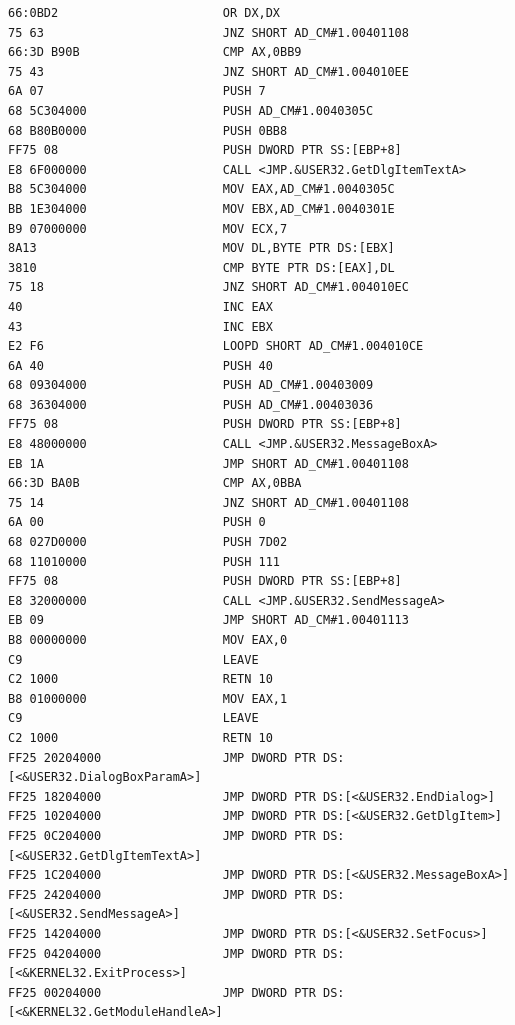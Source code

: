 \documentclass[times, utf8, diplomski, numeric]{fer}
\begin{document}
\begin{lstlisting}[frame=single, caption=Instrukcije unutar PE datoteke, label={lst:PE_instructions_full}]
66:0BD2                       OR DX,DX
75 63                         JNZ SHORT AD_CM#1.00401108
66:3D B90B                    CMP AX,0BB9
75 43                         JNZ SHORT AD_CM#1.004010EE
6A 07                         PUSH 7    
68 5C304000                   PUSH AD_CM#1.0040305C
68 B80B0000                   PUSH 0BB8   
FF75 08                       PUSH DWORD PTR SS:[EBP+8] 
E8 6F000000                   CALL <JMP.&USER32.GetDlgItemTextA> 
B8 5C304000                   MOV EAX,AD_CM#1.0040305C
BB 1E304000                   MOV EBX,AD_CM#1.0040301E 
B9 07000000                   MOV ECX,7
8A13                          MOV DL,BYTE PTR DS:[EBX]
3810                          CMP BYTE PTR DS:[EAX],DL
75 18                         JNZ SHORT AD_CM#1.004010EC
40                            INC EAX
43                            INC EBX
E2 F6                         LOOPD SHORT AD_CM#1.004010CE
6A 40                         PUSH 40  
68 09304000                   PUSH AD_CM#1.00403009
68 36304000                   PUSH AD_CM#1.00403036               
FF75 08                       PUSH DWORD PTR SS:[EBP+8]
E8 48000000                   CALL <JMP.&USER32.MessageBoxA>
EB 1A                         JMP SHORT AD_CM#1.00401108
66:3D BA0B                    CMP AX,0BBA
75 14                         JNZ SHORT AD_CM#1.00401108
6A 00                         PUSH 0 
68 027D0000                   PUSH 7D02  
68 11010000                   PUSH 111 
FF75 08                       PUSH DWORD PTR SS:[EBP+8] 
E8 32000000                   CALL <JMP.&USER32.SendMessageA>  
EB 09                         JMP SHORT AD_CM#1.00401113
B8 00000000                   MOV EAX,0
C9                            LEAVE
C2 1000                       RETN 10
B8 01000000                   MOV EAX,1
C9                            LEAVE
C2 1000                       RETN 10
FF25 20204000                 JMP DWORD PTR DS:[<&USER32.DialogBoxParamA>]
FF25 18204000                 JMP DWORD PTR DS:[<&USER32.EndDialog>]
FF25 10204000                 JMP DWORD PTR DS:[<&USER32.GetDlgItem>]
FF25 0C204000                 JMP DWORD PTR DS:[<&USER32.GetDlgItemTextA>]
FF25 1C204000                 JMP DWORD PTR DS:[<&USER32.MessageBoxA>]
FF25 24204000                 JMP DWORD PTR DS:[<&USER32.SendMessageA>]
FF25 14204000                 JMP DWORD PTR DS:[<&USER32.SetFocus>]
FF25 04204000                 JMP DWORD PTR DS:[<&KERNEL32.ExitProcess>]
FF25 00204000                 JMP DWORD PTR DS:[<&KERNEL32.GetModuleHandleA>]
\end{lstlisting}
\end{document}
